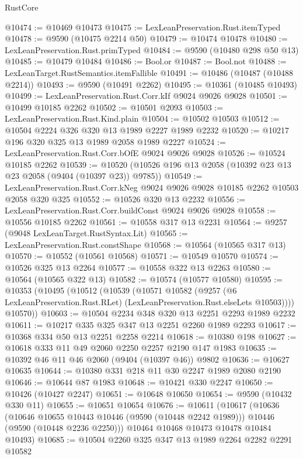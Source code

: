 \begin{lexlean}{RustCore}
\begin{coremodule}
@10474 := @10469 @10473
@10475 := LexLeanPreservation.Rust.itemTyped
@10478 := @9590 (@10475 @2214 @50)
@10479 := @10474 @10478
@10480 := LexLeanPreservation.Rust.primTyped
@10484 := @9590 (@10480 @298 @50 @13)
@10485 := @10479 @10484
@10486 := Bool.or
@10487 := Bool.not
@10488 := LexLeanTarget.RustSemantics.itemFallible
@10491 := @10486 (@10487 (@10488 @2214))
@10493 := @9590 (@10491 @2262)
@10495 := @10361 (@10485 @10493)
@10499 := LexLeanPreservation.Rust.Corr.kIf @9024 @9026 @9028
@10501 := @10499 @10185 @2262
@10502 := @10501 @2093
@10503 := LexLeanPreservation.Rust.Kind.plain
@10504 := @10502 @10503
@10512 := @10504 @2224 @326 @320 @13 @1989 @2227 @1989 @2232
@10520 := @10217 @196 @320 @325 @13 @1989 @2058 @1989 @2227
@10524 := LexLeanPreservation.Rust.Corr.bOfE @9024 @9026 @9028
@10526 := @10524 @10185 @2262
@10539 := @10520 (@10526 @196 @13 @2058 (@10392 @23 @13 @23 @2058 (@9404 (@10397 @23)) @9785))
@10549 := LexLeanPreservation.Rust.Corr.kNeg @9024 @9026 @9028 @10185 @2262 @10503 @2058 @320 @325
@10552 := @10526 @320 @13 @2232
@10556 := LexLeanPreservation.Rust.Corr.buildConst @9024 @9026 @9028
@10558 := @10556 @10185 @2262
@10561 := @10558 @317 @13 @2231
@10564 := @9257 (@9048 LexLeanTarget.RustSyntax.Lit)
@10565 := LexLeanPreservation.Rust.constShape
@10568 := @10564 (@10565 @317 @13)
@10570 := @10552 (@10561 @10568)
@10571 := @10549 @10570
@10574 := @10526 @325 @13 @2264
@10577 := @10558 @322 @13 @2263
@10580 := @10564 (@10565 @322 @13)
@10582 := @10574 (@10577 @10580)
@10595 := @10353
    (@10495
      (@10512
        (@10539
          (@10571
            @10582
            (@9257 (@6 LexLeanPreservation.Rust.RLet) (LexLeanPreservation.Rust.elseLets @10503))))
        @10570))
@10603 := @10504 @2234 @348 @320 @13 @2251 @2293 @1989 @2232
@10611 := @10217 @335 @325 @347 @13 @2251 @2260 @1989 @2293
@10617 := @10368 @334 @50 @13 @2251 @2258 @2214
@10618 := @10380 @198
@10627 := @10618 @333 @11 @49 @2060 @2250 @2257 @2190 @147 @1983
@10635 := @10392 @46 @11 @46 @2060 (@9404 (@10397 @46)) @9802
@10636 := @10627 @10635
@10644 := @10380 @331 @218 @11 @30 @2247 @1989 @2080 @2190
@10646 := @10644 @87 @1983
@10648 := @10421 @330 @2247
@10650 := @10426 (@10427 @2247)
@10651 := @10648 @10650
@10654 := @9590 (@10432 @330 @11)
@10655 := @10651 @10654
@10676 := @10611
    (@10617
      (@10636
        (@10646 @10655 @10443 @10446 (@9590 (@10448 @2242 @1989)))
        @10446
        (@9590 (@10448 @2236 @2250)))
      @10464
      @10468
      @10473
      @10478
      @10484
      @10493)
@10685 := @10504 @2260 @325 @347 @13 @1989 @2264 @2282 @2291 @10582

\end{coremodule}
\end{lexlean}
